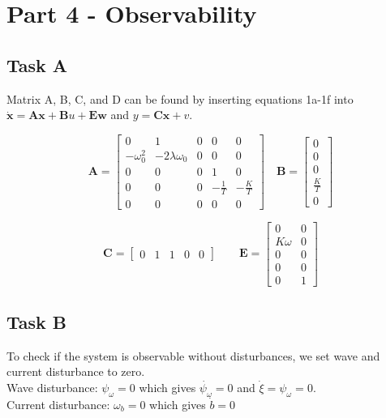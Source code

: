 \section{Part 4 - Observability}
\subsection{Task A}

Matrix A, B, C, and D can be found by inserting equations 1a-1f into $\bm{\dot{x}} = \bm{Ax} + \bm{B}u + \bm{Ew}$ and $y = \bm{Cx} + v$.

\begin{equation}
    \bm{A} =
    \begin{bmatrix}
        0 & 1 & 0 & 0 & 0 \\
        -\omega_0^2 & -2\lambda\omega_0 & 0 & 0 & 0 \\
        0 & 0 & 0 & 1 & 0 \\
        0 & 0 & 0 & -\frac{1}{T} & -\frac{K}{T} \\
        0 & 0 & 0 & 0 & 0
    \end{bmatrix} \quad \bm{B} =
    \begin{bmatrix}
        0 \\
        0 \\
        0 \\
        \frac{K}{T} \\
        0
    \end{bmatrix}
\end{equation}

\begin{equation}
    \bm{C} = 
    \begin{bmatrix}
        0 & 1 & 1 & 0 & 0
    \end{bmatrix} \qquad \bm{E} =
    \begin{bmatrix}
        0 & 0 \\
        K\omega & 0 \\
        0 & 0 \\
        0 & 0 \\
        0 & 1
    \end{bmatrix}
\end{equation}

\subsection{Task B}
To check if the system is observable without disturbances, we set wave and current disturbance to zero. \\ Wave disturbance: $\psi_\omega = 0$ which gives $\dot{\psi_\omega} = 0$ and $\dot{\xi} = \psi_\omega = 0$. \\ Current disturbance: $\omega_b = 0$  which gives $\dot{b} = 0$

